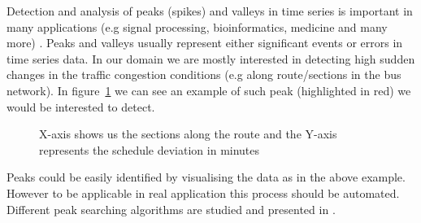 Detection and analysis of peaks (spikes) and valleys in time series is important in many applications (e.g signal processing, bioinformatics, medicine and many more) \cite{ventzas2011peak}. Peaks and valleys usually represent either significant events or errors in time series data. In our domain we are mostly interested in detecting high sudden changes in the traffic congestion conditions (e.g along route/sections in the bus network). In figure~\ref{fig:peakExampleGraph} we can see an example of such peak (highlighted in red) we would be interested to detect.

\begin{figure}[ht]
	\caption{X-axis shows us the sections along the route and the Y-axis represents the schedule deviation in minutes}
	\label{fig:peakExampleGraph}
\end{figure}

Peaks could be easily identified by visualising the data as in the above example. However to be applicable in real application this process should be automated. Different peak searching algorithms are studied and presented in \cite{ventzas2011peak}.



\FloatBarrier

